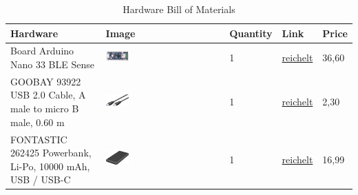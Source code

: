 \begin{table}[H]
	
	\begin{tabular}{m{3.0cm}|m{3.0cm}|m{1.7cm}|m{2cm}|m{1.5cm}}
		
		\hline
		
		\textbf{Hardware} & \textbf{Image} & \textbf{Quantity} & \textbf{Link} & \textbf{Price}\\
		
		\hline
		
		Board Arduino Nano 33 BLE Sense & \includegraphics[width=0.2\textwidth]{Images/ListofMaterials/ArduinoNano33BLESense} & 1 & \href{https://www.reichelt.de/arduino-nano-33-ble-sense-rev-2-nrf52840-ohne-header-ard-nano-33bs2-p336863.html?&trstct=pos_0&nbc=1}{reichelt}  &  36{,}60 \texteuro \\
		
		\hline
		
		GOOBAY 93922 USB 2.0 Cable, A male to micro B male, 0.60 m & \includegraphics[width=0.2\textwidth]{Images/ListofMaterials/USBCable} & 1 & \href{https://www.reichelt.de/usb-3-0-kabel-a-stecker-auf-a-stecker-0-5-m-goobay-95716-p249384.html}{reichelt}  &  2{,}30 \texteuro \\
		
		\hline
		
		FONTASTIC 262425 Powerbank, Li-Po, 10000 mAh, USB / USB-C & \includegraphics[width=0.2\textwidth]{Images/ListofMaterials/Powerbank} & 1 & \href{https://www.reichelt.de/powerbank-li-po-10000-mah-usb-usb-c-schwarz-fontastic-262425-p366911.html}{reichelt}  &  16{,}99 \texteuro \\
		
	\end{tabular}
	
	\caption {Hardware Bill of Materials}
	\label{table:HardwareBOM}
	
\end{table}


